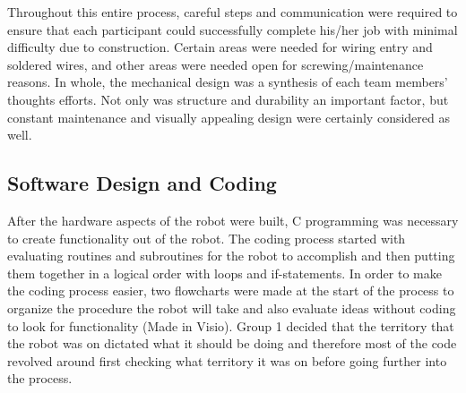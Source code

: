 \documentclass{article}
\begin{document}
	Throughout this entire process, careful steps and communication were required to ensure that each participant could successfully complete his/her job with minimal difficulty due to construction. Certain areas were needed for wiring entry and soldered wires, and other areas were needed open for screwing/maintenance reasons. In whole, the mechanical design was a synthesis of each team members’ thoughts efforts. Not only was structure and durability an important factor, but constant maintenance and visually appealing design were certainly considered as well. 

\subsection{Software Design and Coding}
    After the hardware aspects of the robot were built, C programming was necessary to create functionality out of the robot. The coding process started with evaluating routines and subroutines for the robot to accomplish and then putting them together in a logical order with loops and if-statements. In order to make the coding process easier, two flowcharts were made at the start of the process to organize the procedure the robot will take and also evaluate ideas without coding to look for functionality (Made in Visio). Group 1 decided that the territory that the robot was on dictated what it should be doing and therefore most of the code revolved around first checking what territory it was on before going further into the process. 
    
\end{document}
